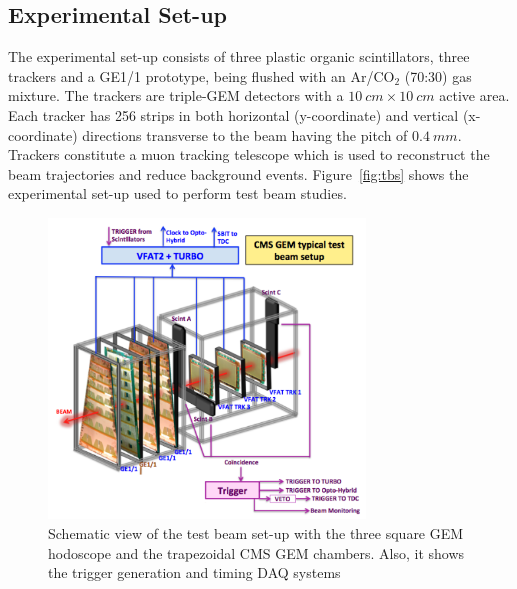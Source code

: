 \subsection{Experimental Set-up}
The experimental set-up consists of three plastic organic scintillators, three trackers and a GE1/1 prototype, being flushed with an Ar/CO$_{2}$ (70:30) gas mixture.
The trackers are triple-GEM detectors with a $10~cm\times10~cm$ active area.
Each tracker has 256 strips in both horizontal (y-coordinate) and vertical (x-coordinate) directions transverse to the beam having the pitch of $0.4~mm$.
Trackers constitute a muon tracking telescope which is used to reconstruct the beam trajectories and reduce background events.
Figure~\ref{fig:tbs} shows the experimental set-up used to perform test beam studies.
\begin{figure}[!htbp]
\centering
\includegraphics[width=0.75\textwidth]{figures/GEM/tb_exptsetup_copy.png}
\caption{Schematic view of the test beam set-up with the three square GEM hodoscope and the trapezoidal CMS GEM chambers. Also, it shows the trigger generation and timing DAQ systems}\label{fig:daq}
\end{figure}
